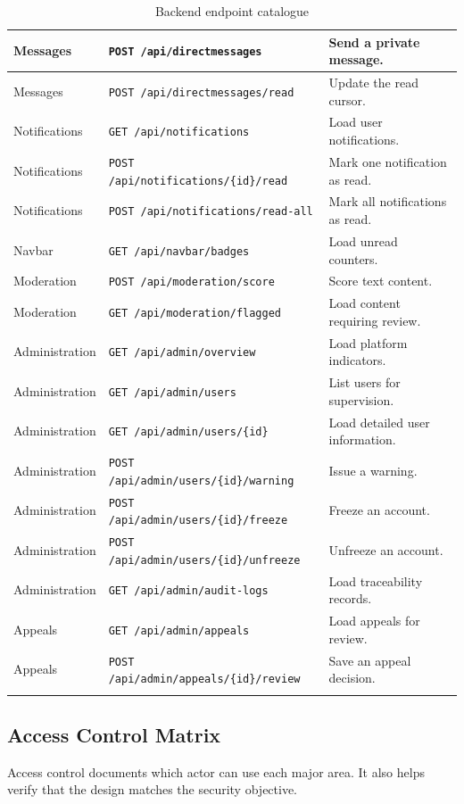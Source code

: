 \begin{longtable}{|m{3.2cm}|m{4.5cm}|m{5.8cm}|}
Messages & \texttt{POST /api/directmessages} & Send a private message. \\
\hline
Messages & \texttt{POST /api/directmessages/read} & Update the read cursor. \\
\hline
Notifications & \texttt{GET /api/notifications} & Load user notifications. \\
\hline
Notifications & \texttt{POST /api/notifications/\{id\}/read} & Mark one notification as read. \\
\hline
Notifications & \texttt{POST /api/notifications/read-all} & Mark all notifications as read. \\
\hline
Navbar & \texttt{GET /api/navbar/badges} & Load unread counters. \\
\hline
Moderation & \texttt{POST /api/moderation/score} & Score text content. \\
\hline
Moderation & \texttt{GET /api/moderation/flagged} & Load content requiring review. \\
\hline
Administration & \texttt{GET /api/admin/overview} & Load platform indicators. \\
\hline
Administration & \texttt{GET /api/admin/users} & List users for supervision. \\
\hline
Administration & \texttt{GET /api/admin/users/\{id\}} & Load detailed user information. \\
\hline
Administration & \texttt{POST /api/admin/users/\{id\}/warning} & Issue a warning. \\
\hline
Administration & \texttt{POST /api/admin/users/\{id\}/freeze} & Freeze an account. \\
\hline
Administration & \texttt{POST /api/admin/users/\{id\}/unfreeze} & Unfreeze an account. \\
\hline
Administration & \texttt{GET /api/admin/audit-logs} & Load traceability records. \\
\hline
Appeals & \texttt{GET /api/admin/appeals} & Load appeals for review. \\
\hline
Appeals & \texttt{POST /api/admin/appeals/\{id\}/review} & Save an appeal decision. \\
\hline
\caption{Backend endpoint catalogue}
\end{longtable}

\subsection*{Access Control Matrix}

Access control documents which actor can use each major area. It also helps verify that the design matches the security objective.

